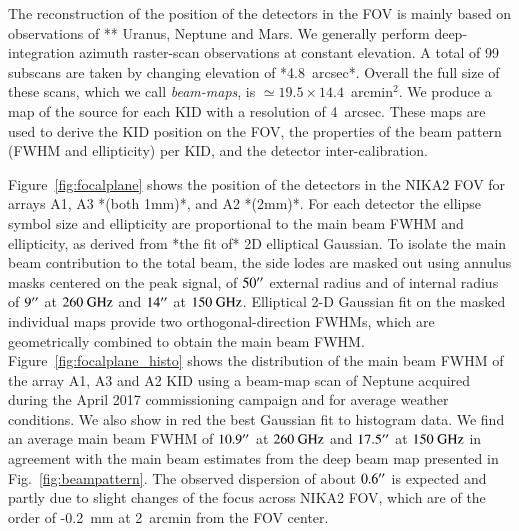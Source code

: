 \documentclass[]{aa} %
\begin{document}
The reconstruction of the position of the detectors in the FOV is mainly based
on observations of ** Uranus, Neptune and Mars. We generally perform
deep-integration azimuth raster-scan observations at constant elevation. A total
of 99 subscans are taken by changing elevation of *4.8~arcsec*. Overall the full
size of these scans, which we call {\it beam-maps}, is $\simeq 19.5\times
14.4$~arcmin$^2$. We produce a map of the source for each KID with a resolution
of 4~arcsec. These maps are used to derive the KID position on the FOV, the
properties of the beam pattern (FWHM and ellipticity) per KID, and the detector
inter-calibration.

Figure~\ref{fig:focalplane} shows the position of the detectors in the NIKA2 FOV
for arrays A1, A3 *(both 1mm)*, and A2 *(2mm)*. For each detector the ellipse symbol size and
ellipticity are proportional to the main beam FWHM and ellipticity, as derived
from *the fit of* 2D elliptical Gaussian. To isolate the main beam contribution to
the total beam, the side lodes are masked out using annulus masks centered on
the peak signal, of $50\arcsec$ external radius and of internal radius of
$9\arcsec$ at $260~\rm{GHz}$ and $14\arcsec$ at $150~\rm{GHz}$. Elliptical 2-D
Gaussian fit on the masked individual maps provide two orthogonal-direction
FWHMs, which are geometrically combined to obtain the main beam
FWHM. Figure~\ref{fig:focalplane_histo} shows the distribution of the main beam
FWHM of the array A1, A3 and A2 KID using a beam-map scan of Neptune acquired
during the April 2017 commissioning campaign and for average weather
conditions. We also show in red the best Gaussian fit to histogram data. We find
an average main beam FWHM of $10.9\arcsec$ at $260~\rm{GHz}$ and $17.5\arcsec$
at $150~\rm{GHz}$ in agreement with the main beam estimates from the deep beam
map presented in Fig.~\ref{fig:beampattern}. The observed dispersion of about
$0.6\arcsec$ is expected and partly due to slight changes of the focus across
NIKA2 FOV, which are of the order of -0.2~\rm{mm} at 2~arcmin from the FOV
center.
 
\end{document}
